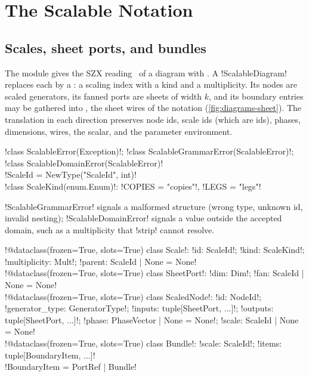 \section{The Scalable Notation}\label{sec:diagrams-scalable}

\subsection{Scales, sheet ports, and bundles}

The module  gives the SZX reading~\cite{carette2019szx,carette2022bangboxes} of a diagram with \bboxes{}. A \py!ScalableDiagram! replaces each \bbox{} by a : a scaling index with a kind and a multiplicity. Its nodes are scaled generators, its fanned ports are sheets of width $k$, and its boundary entries may be gathered into , the sheet wires of the notation (\cref{fig:diagrams-sheet}). The translation in each direction preserves node ids, scale ids (which are \bbox{} ids), phases, dimensions, wires, the scalar, and the parameter environment.

\begin{signature}
\py!class ScalableError(Exception)!; \py!class ScalableGrammarError(ScalableError)!; \py!class ScalableDomainError(ScalableError)!\\
\py!ScaleId = NewType("ScaleId", int)!\\
\py!class ScaleKind(enum.Enum)!: \py!COPIES = "copies"!, \py!LEGS = "legs"!
\end{signature}

\py!ScalableGrammarError! signals a malformed structure (wrong type, unknown id, invalid nesting); \py!ScalableDomainError! signals a value outside the accepted domain, such as a multiplicity that \py!strip! cannot resolve.

\begin{signature}
\py!@dataclass(frozen=True, slots=True) class Scale!: \py!id: ScaleId!; \py!kind: ScaleKind!; \py!multiplicity: Mult!; \py!parent: ScaleId | None = None!\\
\py!@dataclass(frozen=True, slots=True) class SheetPort!: \py!dim: Dim!; \py!fan: ScaleId | None = None!\\
\py!@dataclass(frozen=True, slots=True) class ScaledNode!: \py!id: NodeId!; \py!generator_type: GeneratorType!; \py!inputs: tuple[SheetPort, ...]!; \py!outputs: tuple[SheetPort, ...]!; \py!phase: PhaseVector | None = None!; \py!scale: ScaleId | None = None!\\
\py!@dataclass(frozen=True, slots=True) class Bundle!: \py!scale: ScaleId!; \py!items: tuple[BoundaryItem, ...]!\\
\py!BoundaryItem = PortRef | Bundle!
\end{signature}

